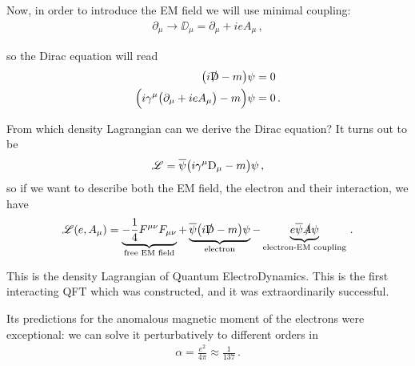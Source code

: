\documentclass[main.tex]{subfiles}
\begin{document}
Now, in order to introduce the EM field we will use minimal coupling: 
%
\begin{align}
\partial_{\mu } \rightarrow \DD_{\mu } = \partial_{\mu } + ie A_{\mu }
\,,
\end{align}
%

so the Dirac equation will read 
%
\begin{subequations}
\begin{align}
\qty( i \slashed{\mathrm{D}} -m ) \psi &= 0  \\
\qty(i \gamma^{\mu } \qty(\partial_{\mu } + ie A_{\mu }) -m ) \psi &= 0 
\,.
\end{align}
\end{subequations}

From which density Lagrangian can we derive the Dirac equation? It turns out to be 
%
\begin{align}
\mathscr{L} = \overline{\psi} \qty(i \gamma^{\mu } \mathrm{D}_{\mu } -m ) \psi 
\,,
\end{align}
%
so if we want to describe both the EM field, the electron and their interaction, we have 
%
\begin{align}
\mathscr{L} (e, A_{\mu }) = 
\underbrace{- \frac{1}{4} F^{\mu \nu } F_{\mu \nu }}_{\text{free EM field}} + \underbrace{\overline{\psi} \qty(i \slashed{\mathrm{D}} - m) \psi}_{\text{electron}} 
- \underbrace{e\overline{\psi} \slashed{A} \psi}_{\text{electron-EM coupling}} 
\,.
\end{align}

This is the density Lagrangian of Quantum ElectroDynamics. 
This is the first interacting QFT which was constructed, and it was extraordinarily successful. 

Its predictions for the anomalous magnetic moment of the electrons were exceptional: we can solve it perturbatively to different orders in 
%
\begin{align}
\alpha = \frac{e^2}{4 \pi } \approx \frac{1}{137}
\,.
\end{align}
\end{document}
